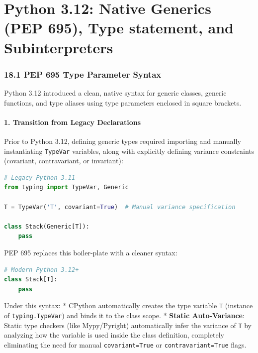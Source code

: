 \hypertarget{python-3.12-native-generics-pep-695-type-statement-and-subinterpreters}{%
\chapter{Python 3.12: Native Generics (PEP 695), Type statement, and
Subinterpreters}\label{python-3.12-native-generics-pep-695-type-statement-and-subinterpreters}}

\hypertarget{pep-695-type-parameter-syntax}{%
\subsection{18.1 PEP 695 Type Parameter
Syntax}\label{pep-695-type-parameter-syntax}}

Python 3.12 introduced a clean, native syntax for generic classes,
generic functions, and type aliases using type parameters enclosed in
square brackets.

\hypertarget{transition-from-legacy-declarations}{%
\subsubsection{1. Transition from Legacy
Declarations}\label{transition-from-legacy-declarations}}

Prior to Python 3.12, defining generic types required importing and
manually instantiating \passthrough{\lstinline!TypeVar!} variables,
along with explicitly defining variance constraints (covariant,
contravariant, or invariant):

\begin{lstlisting}[language=Python]
# Legacy Python 3.11-
from typing import TypeVar, Generic

T = TypeVar('T', covariant=True)  # Manual variance specification

class Stack(Generic[T]):
    pass
\end{lstlisting}

PEP 695 replaces this boiler-plate with a cleaner syntax:

\begin{lstlisting}[language=Python]
# Modern Python 3.12+
class Stack[T]:
    pass
\end{lstlisting}

Under this syntax: * CPython automatically creates the type variable
\passthrough{\lstinline!T!} (instance of
\passthrough{\lstinline!typing.TypeVar!}) and binds it to the class
scope. * \textbf{Static Auto-Variance}: Static type checkers (like
Mypy/Pyright) automatically infer the variance of
\passthrough{\lstinline!T!} by analyzing how the variable is used inside
the class definition, completely eliminating the need for manual
\passthrough{\lstinline!covariant=True!} or
\passthrough{\lstinline!contravariant=True!} flags.

